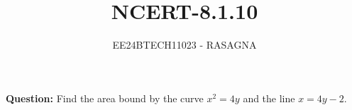 \documentclass[journal]{IEEEtran}
\begin{document}

\vspace{3cm}

\title{NCERT-8.1.10}
\author{EE24BTECH11023 - RASAGNA}

{\let\newpage\relax\maketitle}

\renewcommand{\thefigure}{\theenumi}
\renewcommand{\thetable}{\theenumi}
\setlength{\intextsep}{10pt} %


\renewcommand{\thetable}{\theenumi}
\textbf{Question:}
Find the area bound by the curve $x^2=4y$ and the line $x=4y-2$.
\end{document}
